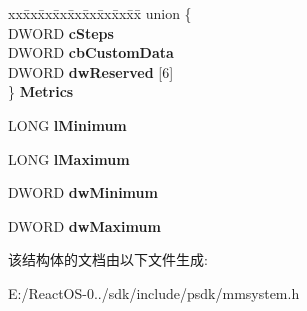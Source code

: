 \begin{DoxyCompactItemize}
\begin{tabbing}
\end{tabbing}\item 
\mbox{\label{structtag_m_i_x_e_r_c_o_n_t_r_o_l_a_a2b011d79cf9d9d1ab0e3a9772802cec2}} 
\begin{tabbing}
xx\=xx\=xx\=xx\=xx\=xx\=xx\=xx\=xx\=\kill
union \{\\
\>DWORD {\bfseries cSteps}\\
\>DWORD {\bfseries cbCustomData}\\
\>DWORD {\bfseries dwReserved} \mbox{[}6\mbox{]}\\
\} {\bfseries Metrics}\\

\end{tabbing}\item 
\mbox{\label{structtag_m_i_x_e_r_c_o_n_t_r_o_l_a_a2509a502009bdff71f17552e30af8bf1}} 
L\+O\+NG {\bfseries l\+Minimum}
\item 
\mbox{\label{structtag_m_i_x_e_r_c_o_n_t_r_o_l_a_a48c60b701264d26fca2b70de1be14b8b}} 
L\+O\+NG {\bfseries l\+Maximum}
\item 
\mbox{\label{structtag_m_i_x_e_r_c_o_n_t_r_o_l_a_a3f9955501c94a2a233741100f9f2067c}} 
D\+W\+O\+RD {\bfseries dw\+Minimum}
\item 
\mbox{\label{structtag_m_i_x_e_r_c_o_n_t_r_o_l_a_a9d149ec427ce752a0150a840cf749ffd}} 
D\+W\+O\+RD {\bfseries dw\+Maximum}
\end{DoxyCompactItemize}


该结构体的文档由以下文件生成\+:\begin{DoxyCompactItemize}
\item 
E\+:/\+React\+O\+S-\/0../sdk/include/psdk/mmsystem.\+h\end{DoxyCompactItemize}
